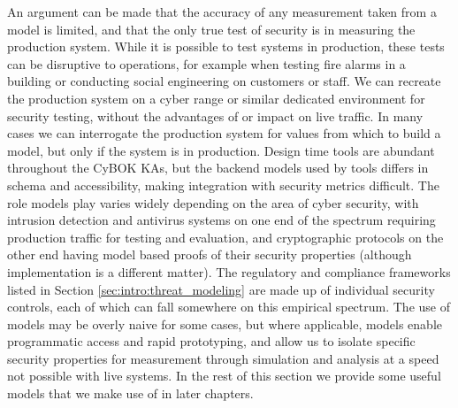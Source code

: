 
An argument can be made that the accuracy of any measurement taken from a model is limited, and that the only true test of security is in measuring the production system. While it is possible to test systems in production, these tests can be disruptive to operations, for example when testing fire alarms in a building or conducting social engineering on customers or staff. We can recreate the production system on a cyber range\cite{Yamin_Katt_Gkioulos_2020} or similar dedicated environment for security testing, without the advantages of or impact on live traffic. In many cases we can interrogate the production system for values from which to build a model, but only if the system is in production. Design time tools are abundant throughout the CyBOK KAs, but the backend models used by tools differs in schema and accessibility, making integration with security metrics difficult. The role models play varies widely depending on the area of cyber security, with intrusion detection and antivirus systems on one end of the spectrum requiring production traffic for testing and evaluation, and cryptographic protocols on the other end having model based proofs of their security properties (although implementation is a different matter). The regulatory and compliance frameworks listed in Section \ref{sec:intro:threat_modeling} are made up of individual security controls, each of which can fall somewhere on this empirical spectrum. The use of models may be overly naive for some cases, but where applicable, models enable programmatic access and rapid prototyping, and allow us to isolate specific security properties for measurement through simulation and analysis at a speed not possible with live systems. In the rest of this section we provide some useful models that we make use of in later chapters. 